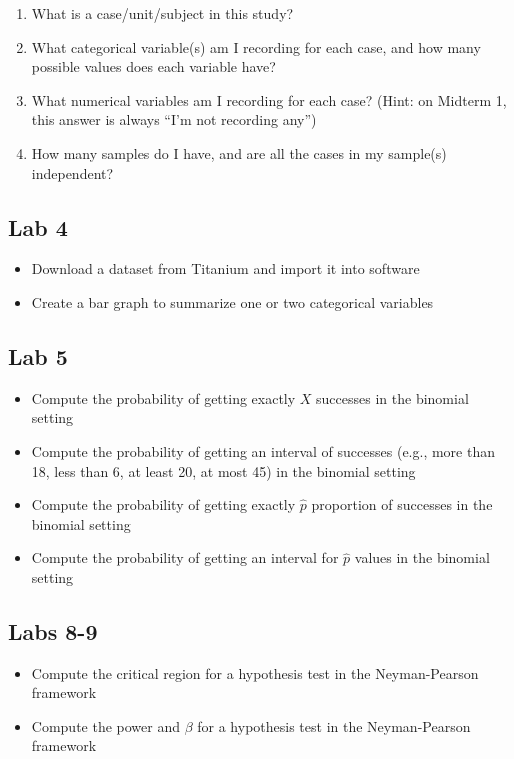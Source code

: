 \documentclass[11pt]{article} %
\begin{document}
\begin{enumerate}
\item What is a case/unit/subject in this study?
\item What categorical variable(s) am I recording for each case, and how many possible values does each variable have?
\item What numerical variables am I recording for each case? (Hint: on Midterm 1, this answer is always ``I'm not recording any'')
\item How many samples do I have, and are all the cases in my sample(s) independent?
\end{enumerate}

\subsection{Lab 4}

\begin{itemize}
\item Download a dataset from Titanium and import it into software
\item Create a bar graph to summarize one or two categorical variables
\end{itemize}

\subsection{Lab 5}

\begin{itemize}
\item Compute the probability of getting exactly $X$ successes in the binomial setting
\item Compute the probability of getting an interval of successes (e.g., more than 18, less than 6, at least 20, at most 45) in the binomial setting
\item Compute the probability of getting exactly $\hat{p}$ proportion of successes in the binomial setting
\item Compute the probability of getting an interval for $\hat{p}$ values in the binomial setting
\end{itemize}

\subsection{Labs 8-9}

\begin{itemize}
\item Compute the critical region for a hypothesis test in the Neyman-Pearson framework
\item Compute the power and $\beta$ for a hypothesis test in the Neyman-Pearson framework
\end{itemize}
\end{document}
